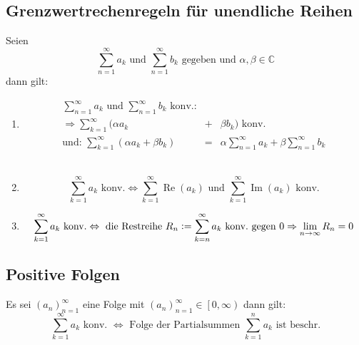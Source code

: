 \documentclass[10pt]{article}
\newcommand{\C}{\mathbb{C}}
\newcommand{\an}{{(a_n)}_{n=1}^\infty}
\newcommand{\ReP}{\operatorname{Re}}
\newcommand{\ImP}{\operatorname{Im}}
\begin{document}
    \subsection{Grenzwertrechenregeln für unendliche Reihen}
    Seien
    \begin{equation*}
        \sum_{n=1}^\infty a_k \text{ und } \sum_{n=1}^\infty b_k
        \text{ gegeben und } \alpha,\beta \in \C
    \end{equation*}
    dann gilt:
    \begin{enumerate}[label= (\alph*)]
        \item
            \begin{eqnarray*}
                \sum_{n=1}^\infty a_k \text{ und } \sum_{n=1}^\infty b_k \text{ konv.:}\\
                \Rightarrow \sum_{k=1}^\infty(\alpha a_k &+& \beta b_k) \text{ konv.}\\
                \text{und: }
                \sum_{k=1}^\infty(\alpha a_k + \beta b_k) &=& \alpha \sum_{n=1}^\infty a_k
                + \beta \sum_{n=1}^\infty b_k
            \end{eqnarray*}\\
        \item
            \begin{equation*}
                \sum_{k=1}^\infty a_k \text{ konv.} \Leftrightarrow
                \sum_{k=1}^\infty \ReP(a_k) \text{ und }
                \sum_{k=1}^\infty \ImP(a_k) \text{ konv.}
            \end{equation*}
        \item
            \begin{equation*}
                \sum_{k=1}^\infty a_k \text{ konv.} \Leftrightarrow
                \text{ die Restreihe } R_n := \sum_{k=n}^\infty a_k \text{ konv.\ gegen }0\\
                \Rightarrow \lim_{n \rightarrow \infty} R_n = 0
            \end{equation*}
    \end{enumerate}

    \subsection{Positive Folgen}
    Es sei $\an$ eine Folge mit $\an \in \left[0, \infty\right)$ dann gilt:
    \begin{equation*}
        \sum_{k=1}^\infty a_k \text{ konv. } \Leftrightarrow
        \text{ Folge der Partialsummen }\sum_{k=1}^n a_k \text{ ist beschr.}
    \end{equation*}
\end{document}
